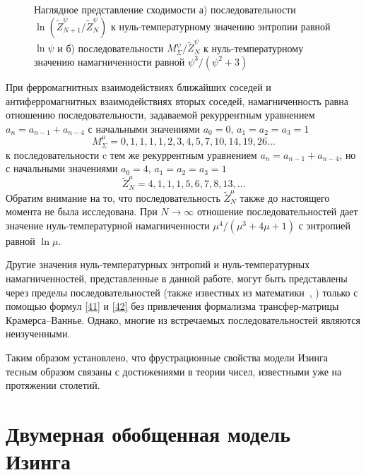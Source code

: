  \begin{figure}[h]
 	\begin{minipage}{0.49\linewidth}
 	\end{minipage}
 	\hfill
 	\begin{minipage}{0.49\linewidth}
 	\end{minipage}
 	\caption{Наглядное представление сходимости а) последовательности $\ln (\widetilde{Z}_{N+1}^{\psi}/\widetilde{Z}_{N}^{\psi})$ к нуль-температурному значению энтропии равной $\ln \psi$ и б) последовательности $M_{\Sigma}^{\psi}/\widetilde{Z}_{N}^{\psi}$ к нуль-температурному значению намагниченности равной $\psi^3/(\psi^2+3)$}
 	\label{fr2}
 \end{figure}

При ферромагнитных взаимодействиях ближайших соседей и антиферромагнитных взаимодействиях вторых соседей, намагниченность равна отношению последовательности, задаваемой рекуррентным уравнением $a_n = a_{n-1} + a_{n-4}$ с начальными значениями $a_0 = 0$, $a_1 = a_2 = a_3 = 1$ \[M^{\mu}_{\Sigma} = 0, 1, 1, 1, 1, 2, 3, 4, 5, 7, 10, 14, 19, 26 \dots\] к последовательности c тем же рекуррентным уравнением $a_n = a_{n-1} + a_{n-4}$, но с начальными значениями $a_0 = 4$, $a_1 = a_2 = a_3 = 1$ \[\widetilde{Z}^{\mu}_{N} = 4, 1, 1, 1, 5, 6, 7, 8, 13, \dots\] Обратим внимание на то, что последовательность $\widetilde{Z}^{\mu}_{N}$ также до настоящего момента не была исследована.
При $N\rightarrow \infty$ отношение последовательностей дает значение нуль-температурной намагниченности $\mu^4/(\mu^3+4\mu+1)$ с энтропией равной $\ln \mu$.

Другие значения нуль-температурных энтропий и нуль-температурных намагниченностей, представленные в данной работе, могут быть представлены через пределы последовательностей (также известных из математики~\cite{sloane1973, sloane1995}, \cite{bicknell1975, vieira2020, adams1982}) только с помощью формул \eqref{41} и \eqref{42} без привлечения формализма трансфер-матрицы Крамерса--Ваннье. Однако, многие из встречаемых последовательностей являются неизученными.

Таким образом установлено, что фрустрационные свойства модели Изинга тесным образом связаны с достижениями в теории чисел, известными уже на протяжении столетий.

\section{Двумерная обобщенная модель Изинга}



